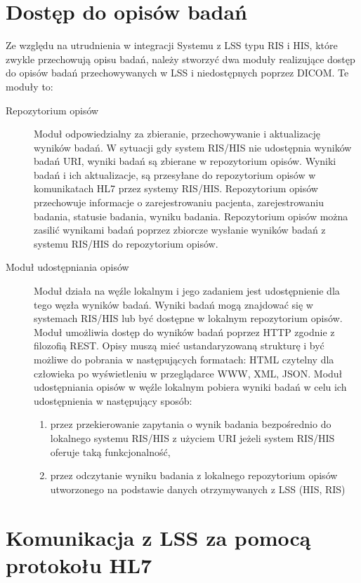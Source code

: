 \documentclass[a4paper]{report}
\begin{document}
\section{Dostęp do opisów badań}

Ze względu na utrudnienia w integracji Systemu z LSS typu RIS i HIS, które zwykle przechowują opisu badań, należy stworzyć dwa moduły realizujące dostęp do opisów badań przechowywanych w LSS i niedostępnych poprzez DICOM. Te moduły to:
\begin{description}
  \item[Repozytorium opisów] Moduł odpowiedzialny za zbieranie, przechowywanie i aktualizację wyników badań. W sytuacji gdy system RIS/HIS nie udostępnia wyników badań URI, wyniki badań są zbierane w repozytorium opisów. Wyniki badań i ich aktualizacje, są przesyłane do repozytorium opisów w komunikatach HL7 przez systemy RIS/HIS. Repozytorium opisów przechowuje informacje o zarejestrowaniu pacjenta, zarejestrowaniu badania, statusie badania, wyniku badania. Repozytorium opisów można zasilić wynikami badań poprzez zbiorcze wysłanie wyników badań z systemu RIS/HIS do repozytorium opisów.
  \item[Moduł udostępniania opisów] Moduł działa na węźle lokalnym i jego zadaniem jest udostępnienie dla tego węzła wyników badań. Wyniki badań mogą znajdować się w systemach RIS/HIS lub być dostępne w lokalnym repozytorium opisów. Moduł umożliwia dostęp do wyników badań poprzez HTTP zgodnie z filozofią REST. Opisy muszą mieć ustandaryzowaną strukturę i być możliwe do pobrania w następujących formatach: HTML czytelny dla człowieka po wyświetleniu w przeglądarce WWW, XML, JSON. Moduł udostępniania opisów w węźle lokalnym pobiera wyniki badań w celu ich udostępnienia w następujący sposób:
  \begin{enumerate}
    \item przez przekierowanie zapytania o wynik badania bezpośrednio do lokalnego systemu RIS/HIS z użyciem URI  jeżeli system RIS/HIS oferuje taką funkcjonalność,
    \item przez odczytanie wyniku badania z lokalnego repozytorium opisów utworzonego na podstawie danych otrzymywanych z LSS (HIS, RIS)
  \end{enumerate}

\end{description}

\section{Komunikacja z LSS za pomocą protokołu HL7}
\end{document}
